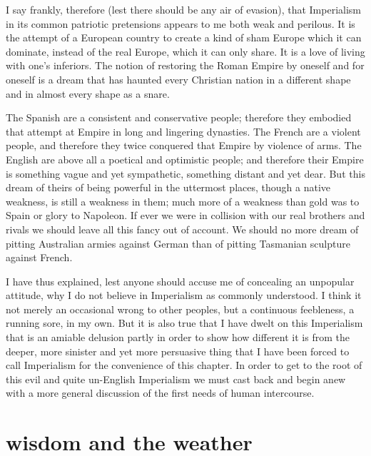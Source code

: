 \documentclass[final,10pt,letterpaper,twocolumn,openany]{book}
\begin{document}
I say frankly, therefore (lest there should be any air of evasion), that
Imperialism in its common patriotic pretensions appears to me both weak
and perilous. It is the attempt of a European country to create a kind of
sham Europe which it can dominate, instead of the real Europe, which it
can only share. It is a love of living with one's inferiors. The notion of
restoring the Roman Empire by oneself and for oneself is a dream that has
haunted every Christian nation in a different shape and in almost every
shape as a snare.

 The Spanish are a consistent and conservative people;
therefore they embodied that attempt at Empire in long and lingering
dynasties. The French are a violent people, and therefore they twice
conquered that Empire by violence of arms. The English are above all a
poetical and optimistic people; and therefore their Empire is something
vague and yet sympathetic, something distant and yet dear. But this dream
of theirs of being powerful in the uttermost places, though a native
weakness, is still a weakness in them; much more of a weakness than gold
was to Spain or glory to Napoleon. If ever we were in collision with our
real brothers and rivals we should leave all this fancy out of account. We
should no more dream of pitting Australian armies against German than of
pitting Tasmanian sculpture against French. 

I have thus explained, lest
anyone should accuse me of concealing an unpopular attitude, why I do
not believe in Imperialism as commonly understood. I think it not merely
an occasional wrong to other peoples, but a continuous feebleness, a
running sore, in my own. But it is also true that I have dwelt on this
Imperialism that is an amiable delusion partly in order to show how
different it is from the deeper, more sinister and yet more persuasive thing
that I have been forced to call Imperialism for the convenience of this
chapter. In order to get to the root of this evil and quite un-English
Imperialism we must cast back and begin anew with a more general
discussion of the first needs of human intercourse.

\section{wisdom and the weather}
\end{document}

